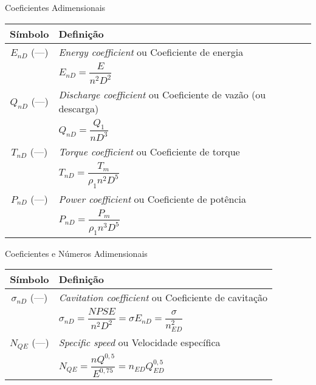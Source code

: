     \begin{frame}{Coeficientes Adimensionais}\vspace*{-1em}
        \setlength{\tabcolsep}{2mm}
        \noindent\begin{longtable}{cp{110mm}}
            \alert{Símbolo} & \alert{Definição} \\
            \hline
            $E_{nD}$ (---) &
            \textit{Energy coefficient\/} ou Coeficiente de energia \\
            & \alert{$E_{nD} = \dfrac{E}{n^2D^2}$} \\
            $Q_{nD}$ (---) &
            \textit{Discharge coefficient\/} ou Coeficiente de vazão (ou descarga) \\
            & \alert{$Q_{nD} = \dfrac{Q_1}{nD^3}$} \\
            $T_{nD}$ (---) &
            \textit{Torque coefficient\/} ou Coeficiente de torque \\
            & \alert{$T_{nD} = \dfrac{T_m}{\rho_1n^2D^5}$} \\
            $P_{nD}$ (---) &
            \textit{Power coefficient\/} ou Coeficiente de potência \\
            & \alert{$P_{nD} = \dfrac{P_m}{\rho_1n^3D^5}$} \\
            \hline
        \end{longtable}
    \end{frame}

    \begin{frame}{Coeficientes e Números Adimensionais}\vspace*{-1em}
        \setlength{\tabcolsep}{2mm}
        \noindent\begin{longtable}{cp{110mm}}
            \alert{Símbolo} & \alert{Definição} \\
            \hline
            $\sigma_{nD}$ (---) &
            \textit{Cavitation coefficient\/} ou Coeficiente de cavitação \\
            & \alert{$\sigma_{nD} = \dfrac{NPSE}{n^2D^2} = \sigma E_{nD} =
            \dfrac{\sigma}{n_{ED}^2}$} \\
            $N_{QE}$ (---) &
            \textit{Specific speed\/} ou Velocidade específica \\
            & \alert{$N_{QE} = \dfrac{nQ^{0,5}}{E^{0,75}} = n_{ED}Q_{ED}^{0,5}$} \\
            \hline
        \end{longtable}
    \end{frame}


